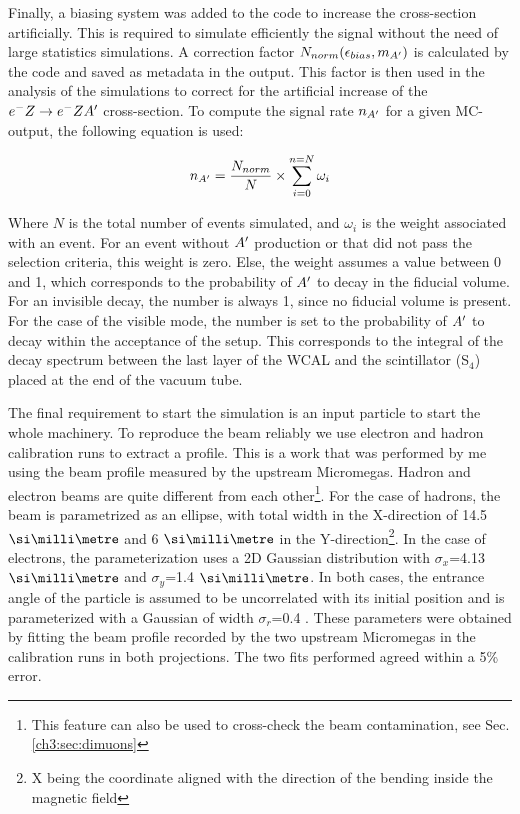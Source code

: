 Finally, a biasing system was added to the code to increase the cross-section artificially. This is required to simulate efficiently the signal without the need of large statistics simulations. A correction factor $N_{norm}(\epsilon_{bias},m_{A'})$ is calculated by the code and saved as metadata in the output. This factor is then used in the analysis of the simulations to correct for the artificial increase of the $e^- Z \to e^- Z A'$ cross-section. To compute the signal rate $n_{A'}$ for a given MC-output, the following equation is used:

\begin{equation}
  \label{eq:1}
  n_{A'} = \frac{N_{norm}}{N} \times \sum^{n=N}_{i=0} \omega_i
\end{equation}

Where $N$ is the total number of events simulated, and $\omega_i$ is the weight associated with an event. For an event without $A'$ production or that did not pass the selection criteria, this weight is zero. Else, the weight assumes a value between 0 and 1, which corresponds to the probability of $A'$ to decay in the fiducial volume. For an invisible decay, the number is always 1, since no fiducial volume is present. For the case of the visible mode, the number is set to the probability of $A'$ to decay within the acceptance of the setup. This corresponds to the integral of the decay spectrum between the last layer of the WCAL and the scintillator (S$_4$) placed at the end of the vacuum tube.

The final requirement to start the simulation is an input particle to start the whole machinery. 
To reproduce the beam reliably we use electron and hadron calibration runs to extract a profile. This is a work that was performed by me using the beam profile measured by the upstream Micromegas. Hadron and electron beams are quite different from each other\footnote{This feature can also be used to cross-check the beam contamination, see Sec.\ref{ch3:sec:dimuons}}. For the case of hadrons, the beam is parametrized as an ellipse, with total width in the X-direction of 14.5 $\mmi$ and 6 $\mmi$ in the Y-direction\footnote{X being the coordinate aligned with the direction of the bending inside the magnetic field}. In the case of electrons, the parameterization uses a 2D Gaussian distribution with $\sigma_x$=4.13 $\mmi$ and $\sigma_y$=1.4 $\mmi$. In both cases, the entrance angle of the particle is assumed to be uncorrelated with its initial position and is parameterized with a Gaussian of width $\sigma_r$=0.4 \mrad. These parameters were obtained by fitting the beam profile recorded by the two upstream Micromegas in the calibration runs in both projections. The two fits performed agreed within a 5\% error.

